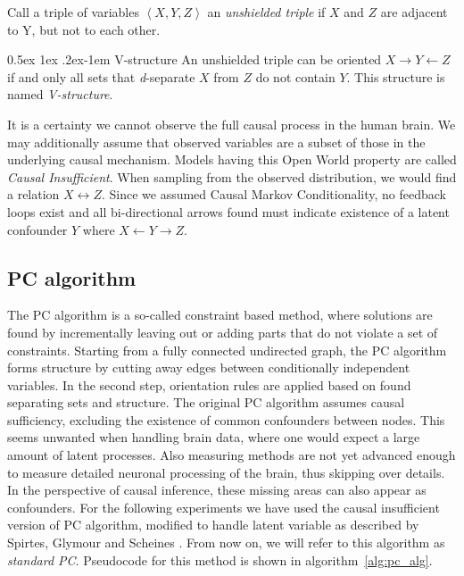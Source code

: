 \documentclass[a4paper, 10pt, english, onecolumn]{article}
\makeatletter
\renewcommand{\paragraph}{%
  \@startsection{paragraph}{4}%
  {\z@}{0.5ex \@plus 1ex \@minus .2ex}{-1em}%
  {\normalfont\normalsize\bfseries}%
}
\makeatother
\begin{document}
Call a triple of variables $\left < X,Y,Z \right >$ an \textit{unshielded triple} if $X$ and $Z$ are adjacent to Y, but not to each other.

\paragraph{V-structure}
An unshielded triple can be oriented $X \rightarrow Y \leftarrow Z$ if and only all sets that \textit{d}-separate $X$ from $Z$ do not contain $Y$.
This structure is named \textit{V-structure}.

It is a certainty we cannot observe the full causal process in the human brain.
We may additionally assume that observed variables are a subset of those in the underlying causal mechanism.
Models having this Open World property are called \textit{Causal Insufficient}.
When sampling from the observed distribution, we would find a relation $X \leftrightarrow Z$.
Since we assumed Causal Markov Conditionality, no feedback loops exist and all bi-directional arrows found must indicate existence of a latent confounder $Y$ where $X \leftarrow Y \rightarrow Z$.

\subsection{PC algorithm}
The PC algorithm is a so-called constraint based method, where solutions are found by incrementally leaving out or adding parts that do not violate a set of constraints.
Starting from a fully connected undirected graph, the PC algorithm forms structure by cutting away edges between conditionally independent variables.
In the second step, orientation rules are applied based on found separating sets and structure.
The original PC algorithm assumes causal sufficiency, excluding the existence of common confounders between nodes.
This seems unwanted when handling brain data, where one would expect a large amount of latent processes.
Also measuring methods are not yet advanced enough to measure detailed neuronal processing of the brain, thus skipping over details.
In the perspective of causal inference, these missing areas can also appear as confounders.
For the following experiments we have used the causal insufficient version of PC algorithm, modified to handle latent variable as described by Spirtes, Glymour and Scheines \cite[p.165-167]{spirtes2000}.
From now on, we will refer to this algorithm as \textit{standard PC}.
Pseudocode for this method is shown in algorithm~\ref{alg:pc_alg}.
\end{document}
